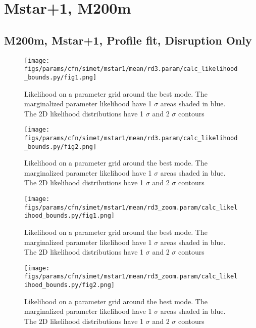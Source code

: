 \documentclass[twocolumn]{article}
\begin{document}

\section{Mstar+1, M200m}
\subsection{M200m, Mstar+1, Profile fit, Disruption Only}
\begin{figure}[H]
  \center\texttt{[image: figs/params/cfn/simet/mstar1/mean/rd3.param/calc\_likelihood\_bounds.py/fig1.png]}
  \caption{Likelihood on a parameter grid around the best mode. The marginalized parameter likelihood have
    1 $\sigma$ areas shaded in blue. The 2D likelihood distributions have 1 $\sigma$  and 2 $\sigma$ contours}
  \label{fig:basic_rd:likelihood}
\end{figure}

\begin{figure}[H]
  \center\texttt{[image: figs/params/cfn/simet/mstar1/mean/rd3.param/calc\_likelihood\_bounds.py/fig2.png]}
  \caption{Likelihood on a parameter grid around the best mode. The marginalized parameter likelihood have
    1 $\sigma$ areas shaded in blue. The 2D likelihood distributions have 1 $\sigma$  and 2 $\sigma$ contours}
  \label{fig:basic_rd:likelihood}
\end{figure}

\begin{figure}[H]
  \center\texttt{[image: figs/params/cfn/simet/mstar1/mean/rd3\_zoom.param/calc\_likelihood\_bounds.py/fig1.png]}
  \caption{Likelihood on a parameter grid around the best mode. The marginalized parameter likelihood have
    1 $\sigma$ areas shaded in blue. The 2D likelihood distributions have 1 $\sigma$  and 2 $\sigma$ contours}
  \label{fig:basic_rd:likelihood}
\end{figure}

\begin{figure}[H]
  \center\texttt{[image: figs/params/cfn/simet/mstar1/mean/rd3\_zoom.param/calc\_likelihood\_bounds.py/fig2.png]}
  \caption{Likelihood on a parameter grid around the best mode. The marginalized parameter likelihood have
    1 $\sigma$ areas shaded in blue. The 2D likelihood distributions have 1 $\sigma$  and 2 $\sigma$ contours}
  \label{fig:basic_rd:likelihood}
\end{figure}
\end{document}
